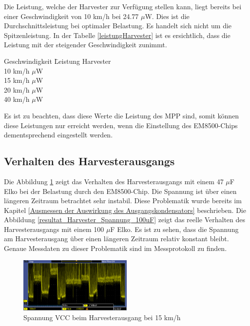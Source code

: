 Die Leistung, welche der Harvester zur Verfügung stellen kann, liegt bereits bei einer Geschwindigkeit von 10 km/h bei 24.77 $\mu$W. Dies ist die Durchschnittsleistung bei optimaler Belastung. Es handelt sich nicht um die Spitzenleistung. In der Tabelle \ref{leistungHarvester} ist es ersichtlich, dass die Leistung mit der steigender Geschwindigkeit zunimmt.

\begin{minipage}{\textwidth}
    \begin{tabbing}
    \label{leistungHarvester}
        Geschwindigkeit \quad\= Leistung Harvester \\[0.8ex]
        10 km/h    $\mu$W \\
        15 km/h    $\mu$W \\
        20 km/h  $\mu$W \\
        40 km/h  $\mu$W \\
    \end{tabbing}
\end{minipage}

Es ist zu beachten, dass diese Werte die Leistung des MPP sind, somit können diese Leistungen nur erreicht werden, wenn die Einstellung des EM8500-Chips dementsprechend eingestellt werden.


\subsection{Verhalten des Harvesterausgangs}

Die Abbildung \ref{resultat_Harvester_Spannung_47uF} zeigt das Verhalten des Harvesterausgangs mit einem 47 $\mu$F Elko bei der Belastung durch den EM8500-Chip. Die Spannung ist über einen längeren Zeitraum betrachtet sehr instabil. Diese Problematik wurde bereits im Kapitel \ref{Ausmessen der Auswirkung des Ausgangskondensators} beschrieben. Die Abbildung \ref{resultat_Harvester_Spannung_100uF} zeigt das reelle Verhalten des Harvesterausgangs mit einem 100 $\mu$F Elko. Es ist zu sehen, dass die Spannung am Harvesterausgang über einen längeren Zeitraum relativ konstant bleibt. Genaue Messdaten zu dieser Problematik sind im Messprotokoll  zu finden.

\begin{figure}[ht]
    \includegraphics[width=0.5\textwidth]{4Resultate/imag/SpannungVCC_47uF.PNG} 
    \caption{Spannung VCC beim Harvesterausgang bei 15 km/h}
    \label{resultat_Harvester_Spannung_47uF}
\end{figure}

